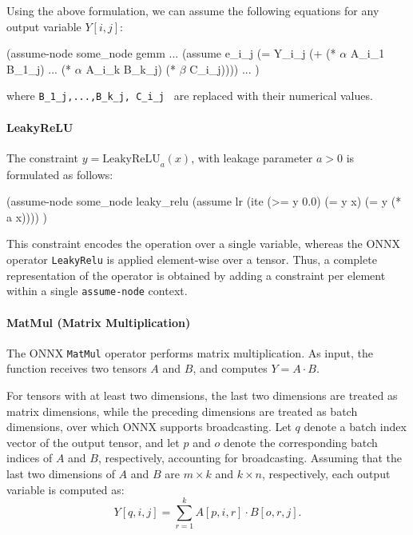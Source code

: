 Using the above formulation, we can assume the following equations for any output variable $Y[i,j]$:
 
\begin{code}[style=lbnf,mathescape=true]
(assume-node some_node gemm
    ...
    (assume e_i_j (= Y_i_j (+ (* $\alpha$ A_i_1 B_1_j) ... 
                              (* $\alpha$ A_i_k B_k_j)
                              (* $\beta$ C_i_j))))
    ...
)                             
\end{code}

where \texttt{B\_1\_j,...,B\_k\_j, C\_i\_j } are replaced with their numerical values.


\paragraph{LeakyReLU}
The constraint $y = \mathrm{LeakyReLU}_a(x)$, with leakage parameter $a>0$ is formulated as
follows: 

\begin{code}[style=lbnf]
(assume-node some_node leaky_relu
    (assume lr (ite (>= y 0.0) 
                    (= y x) 
                    (= y (* a x)))) 
)                    
\end{code}

\noindent This constraint encodes the operation over a single variable, whereas the ONNX operator \texttt{LeakyRelu} is applied element-wise over a tensor. 
Thus, a complete representation of the operator is obtained by adding a constraint per element within a single \texttt{assume-node} context.

\paragraph{MatMul (Matrix Multiplication)}
\label{rule:matmul}
The ONNX \texttt{MatMul} operator performs matrix multiplication. As input, the function receives two tensors $A$ and $B$, and computes $Y = A \cdot B$.

For tensors with at least two dimensions, the last two dimensions are treated as matrix dimensions, while the preceding dimensions are treated as batch dimensions, over which ONNX supports broadcasting. Let $q$ denote a batch index vector of the output tensor, and let $p$ and $o$ denote the corresponding batch indices of $A$ and $B$, respectively, accounting for broadcasting.
Assuming that the last two dimensions of $A$ and $B$ are $m \times k$ and $k \times n$, respectively, each output variable is computed as:
\[
Y[q,i,j] = \sum_{r=1}^{k} A[p,i,r] \cdot B[o,r,j].
\]

